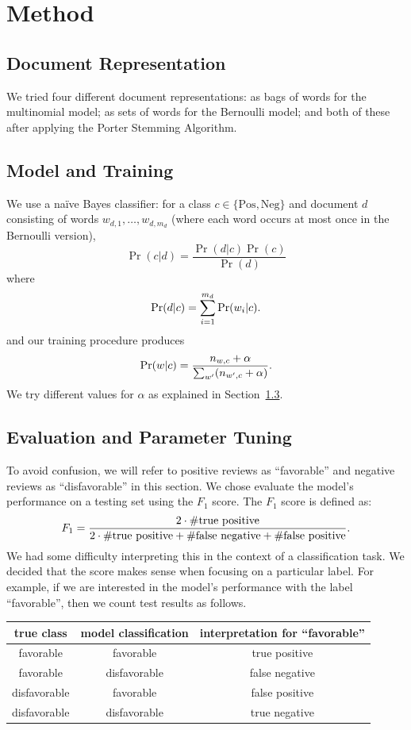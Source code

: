\documentclass{article}
\newcommand{\PosC}{\mathrm{Pos}}
\newcommand{\NegC}{\mathrm{Neg}}
\begin{document}
\section{Method}

\subsection{Document Representation}

We tried four different document representations: as bags of words for the multinomial model; as sets of words for the Bernoulli model; and both of these after applying the Porter Stemming Algorithm.

\subsection{Model and Training}

We use a na\"ive Bayes classifier: for a class \(c \in \{\PosC, \NegC\}\) and document \(d\) consisting of words \(w_{d,1},\dotsc,w_{d,m_d}\) (where each word occurs at most once in the Bernoulli version),
\[\Pr(c|d)=\frac{\Pr(d|c)\Pr(c)}{\Pr(d)}\]
where
\[\Pr(d|c)=\sum_{i=1}^{m_d}\Pr(w_i|c)\ldotp\]
and our training procedure produces
\[\Pr(w|c)=\frac{n_{w,c}+\alpha}{\sum_{w'}(n_{w',c}+\alpha)}\ldotp\]
We try different values for \(\alpha\) as explained in Section~\ref{sec:EvalAndTuning}.

\subsection{Evaluation and Parameter Tuning}
\label{sec:EvalAndTuning}

To avoid confusion, we will refer to positive reviews as ``favorable'' and negative reviews as ``disfavorable'' in this section.  We chose evaluate the model's performance on a testing set using the \(F_1\) score.  The \(F_1\) score is defined as:
\[
  F_1=
  \frac
      {2\cdot\#\text{true positive}}
      {2\cdot\#\text{true positive}+\#\text{false negative}+\#\text{false positive}}
  \ldotp
\]
We had some difficulty interpreting this in the context of a classification task.
We decided that the score makes sense when focusing on a particular label.
For example, if we are interested in the model's performance with the label ``favorable'', then we count test results as follows.

\begin{tabular}{c|c|c}
  true class & model classification & interpretation for ``favorable'' \\
  \hline
  favorable & favorable & true positive \\
  favorable & disfavorable & false negative \\
  disfavorable & favorable & false positive \\
  disfavorable & disfavorable & true negative \\
\end{tabular}
\end{document}
